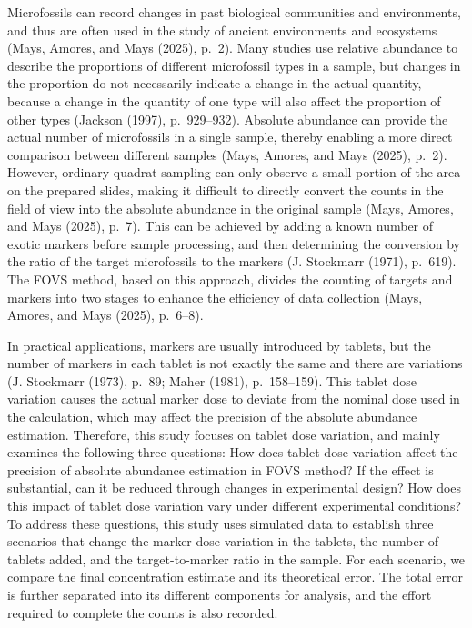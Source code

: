 \documentclass[
  12pt,
]{article}
\begin{document}
Microfossils can record changes in past biological communities and
environments, and thus are often used in the study of ancient
environments and ecosystems (Mays, Amores, and Mays (2025), p.~2). Many
studies use relative abundance to describe the proportions of different
microfossil types in a sample, but changes in the proportion do not
necessarily indicate a change in the actual quantity, because a change
in the quantity of one type will also affect the proportion of other
types (Jackson (1997), p.~929--932). Absolute abundance can provide the
actual number of microfossils in a single sample, thereby enabling a
more direct comparison between different samples (Mays, Amores, and Mays
(2025), p.~2). However, ordinary quadrat sampling can only observe a
small portion of the area on the prepared slides, making it difficult to
directly convert the counts in the field of view into the absolute
abundance in the original sample (Mays, Amores, and Mays (2025), p.~7).
This can be achieved by adding a known number of exotic markers before
sample processing, and then determining the conversion by the ratio of
the target microfossils to the markers (J. Stockmarr (1971), p.~619).
The FOVS method, based on this approach, divides the counting of targets
and markers into two stages to enhance the efficiency of data collection
(Mays, Amores, and Mays (2025), p.~6--8).

In practical applications, markers are usually introduced by tablets,
but the number of markers in each tablet is not exactly the same and
there are variations (J. Stockmarr (1973), p.~89; Maher (1981),
p.~158--159). This tablet dose variation causes the actual marker dose
to deviate from the nominal dose used in the calculation, which may
affect the precision of the absolute abundance estimation. Therefore,
this study focuses on tablet dose variation, and mainly examines the
following three questions: How does tablet dose variation affect the
precision of absolute abundance estimation in FOVS method? If the effect
is substantial, can it be reduced through changes in experimental
design? How does this impact of tablet dose variation vary under
different experimental conditions? To address these questions, this
study uses simulated data to establish three scenarios that change the
marker dose variation in the tablets, the number of tablets added, and
the target-to-marker ratio in the sample. For each scenario, we compare
the final concentration estimate and its theoretical error. The total
error is further separated into its different components for analysis,
and the effort required to complete the counts is also recorded.
\end{document}
